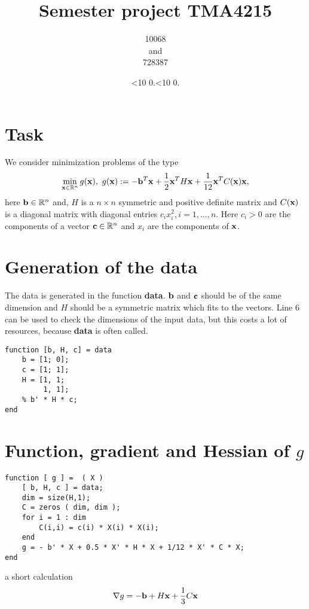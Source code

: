 \documentclass[a4paper,12pt]{article}
\newcommand{\leadingzero}[1]{\ifnum #1<10 0\the#1\else\the#1\fi}
\newcommand{\mytoday}{\leadingzero{\day}.\leadingzero{\month}.\the\year}
\newcommand{\code}[1]{\textbf{#1}}
\begin{document}
\title{Semester project TMA4215}
\author{10068\\ and\\ 728387}
\date{\mytoday}
\maketitle
\newpage


\section{Task}
We consider minimization problems of the type
\begin{align*}
\min_{{\bf x} \in \mathbb{R}^n} g({\bf x}),\,\, g({\bf x}):=-{\bf b}^T{\bf x} + \frac12{\bf x}^TH{\bf x}+\frac1{12}{\bf x}^TC({\bf x}){\bf x},
\end{align*}
here ${\bf b} \in \mathbb{R}^n$ and, $H$ is a $n \times n$ symmetric and positive definite matrix and $C(\bf{x})$ is a diagonal
matrix with diagonal entries $c_i x^2_i, i = 1, . . . , n$. 
Here $c_i > 0$ are the components of a vector ${\bf c} \in \mathbb{R}^n$ 
and $x_i$ are the components of $\bf{x}$. 


\section{Generation of the data}
The data is generated in the function \code{data}.
$\bf{b}$ and $\bf{c}$ should be of the same dimension and $H$ should be a symmetric matrix which fits to the vectors.
Line 6 can be used to check the dimensions of the input data, but this costs a lot of resources, because \code{data} is often called. 
\begin{lstlisting}
function [b, H, c] = data
	b = [1; 0];
	c = [1; 1];
	H = [1, 1;
	     1, 1];
	% b' * H * c;
end
\end{lstlisting}

\section{Function, gradient and Hessian of $g$}

\begin{lstlisting}
function [ g ] =  ( X )
	[ b, H, c ] = data;
	dim = size(H,1);
	C = zeros ( dim, dim );
	for i = 1 : dim
		C(i,i) = c(i) * X(i) * X(i);
	end
	g = - b' * X + 0.5 * X' * H * X + 1/12 * X' * C * X;
end
\end{lstlisting}

a short calculation 
\begin{align}\label{grad}
{\bf\nabla} g = -{\bf b} + H{\bf x} + \frac13C{\bf x}
\end{align}
\end{document}
